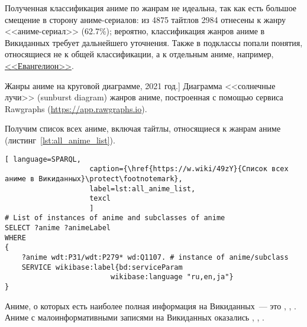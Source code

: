 Полученная классификация аниме по жанрам не идеальна, так как есть большое смещение в сторону аниме-сериалов: из \num{4875} тайтлов \num{2984} отнесены к жанру <<аниме-сериал>> (\num{62,7}\%); вероятно, классификация жанров аниме в Викиданных требует дальнейшего уточнения. Также в подклассы попали понятия, относящиеся не к общей классификации, а к отдельным аниме, например, \href{https://w.wiki/4L5p}{<<Евангелион>>}.

\begin{marginfigure}[0.0cm]
{
	\setlength{\fboxsep}{0pt}%
	\setlength{\fboxrule}{1pt}%
}
\caption
[Жанры аниме на круговой диаграмме, 2021 год.]
{
Диаграмма <<солнечные лучи>> (sunburst diagram) жанров аниме, построенная с помощью сервиса Rawgraphs (\href{https://app.rawgraphs.io}{https://app.rawgraphs.io}).\newline
}
\label{fig:anime_piechart}
\end{marginfigure}

Получим список всех аниме, включая тайтлы, относящиеся к жанрам аниме (листинг~\ref{lst:all_anime_list}).

\begin{lstlisting}[ language=SPARQL, 
                    caption={\href{https://w.wiki/49zY}{Список всех аниме в Викиданных}\protect\footnotemark},
                    label=lst:all_anime_list,
                    texcl 
                    ]
# List of instances of anime and subclasses of anime
SELECT ?anime ?animeLabel
WHERE
{
    ?anime wdt:P31/wdt:P279* wd:Q1107. # instance of anime/subclass
    SERVICE wikibase:label{bd:serviceParam
					     wikibase:language "ru,en,ja"}
}
\end{lstlisting}%

Аниме, о которых есть наиболее полная информация на Викиданных~--- это , , . Аниме с малоинформативными записями на Викиданных оказались , , .

